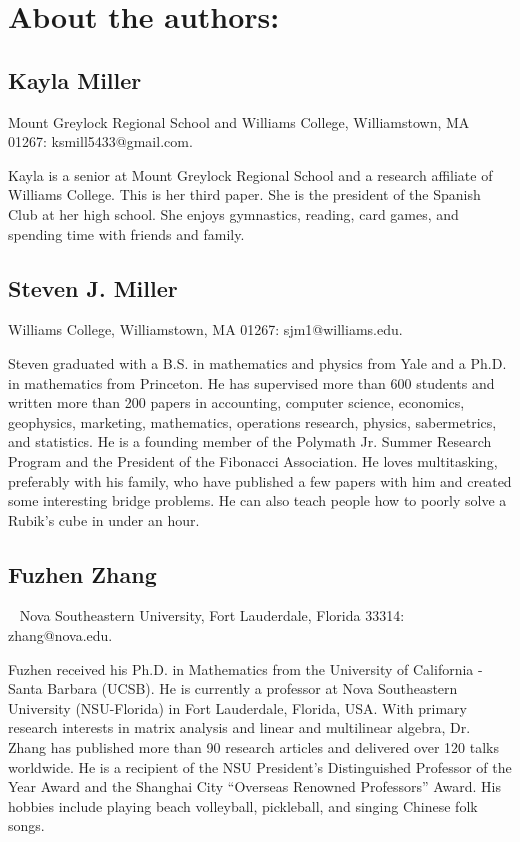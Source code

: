 \documentclass{article}
\begin{document}
\section*{About the authors:}



\subsection*{Kayla Miller}
Mount Greylock Regional School and Williams College, Williamstown, MA 01267: ksmill5433@gmail.com.

Kayla is a senior at Mount Greylock Regional School and a research affiliate of Williams College. This is her third
paper. She is the president of the Spanish Club at her high school. She enjoys gymnastics, reading, card games, and
spending time with friends and family. 



\subsection*{Steven J. Miller}

Williams College, Williamstown, MA 01267: sjm1@williams.edu.

Steven graduated with a B.S. in mathematics and physics from Yale and a Ph.D. in
mathematics from Princeton. He has supervised more than 600 students and
written more than 200 papers in accounting, computer science, economics,
geophysics, marketing, mathematics, operations research, physics,
sabermetrics, and statistics. He is a founding member of the Polymath Jr.
Summer Research Program and the President of the Fibonacci Association. He
loves multitasking, preferably with his family, who have published a few
papers with him and created some interesting bridge problems. He can also
teach people how to poorly solve a Rubik's cube in under an hour.


\subsection*{Fuzhen Zhang}~
Nova Southeastern University, Fort Lauderdale, Florida 33314: zhang@nova.edu.

Fuzhen received his Ph.D. in Mathematics from the University of California - Santa Barbara (UCSB). He is currently a
professor at Nova Southeastern University (NSU-Florida) in Fort Lauderdale, Florida, USA. With primary research interests in matrix analysis and linear and multilinear algebra, Dr. Zhang has published more than 90 research articles and delivered over 120 talks worldwide. He is a recipient of the NSU President's Distinguished Professor of the Year Award and the Shanghai City ``Overseas
Renowned Professors'' Award. His hobbies include playing beach volleyball, pickleball, and singing Chinese folk songs. %
\end{document}
